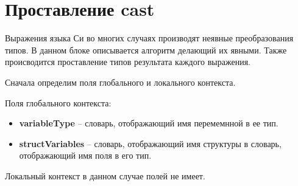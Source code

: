 \section{Проставление cast}
Выражения языка Си во многих случаях производят неявные преобразования типов. В данном блоке описывается алгоритм делающий их явными. Также происводится проставление типов результата каждого выражения.

Сначала определим поля глобального и локального контекста.

Поля глобального контекста:
\begin{itemize}
    \item \textbf{variableType} -- словарь, отображающий имя перемемнной в ее тип.
    \item \textbf{structVariables} -- словарь, отображающий имя структуры в словарь, отображающий имя поля в его тип.
\end{itemize}
Локальный контекст в данном случае полей не имеет.

